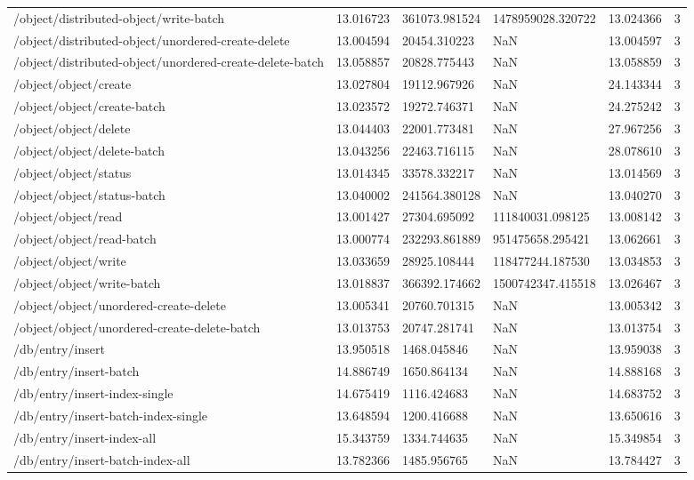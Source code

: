 \begin{tabularx}{\linewidth}{XXXXXX}
/object/distributed-object/write-batch & 13.016723 & 361073.981524 & 1478959028.320722 & 13.024366 & 3 \\
/object/distributed-object/unordered-create-delete & 13.004594 & 20454.310223 & NaN & 13.004597 & 3 \\
/object/distributed-object/unordered-create-delete-batch & 13.058857 & 20828.775443 & NaN & 13.058859 & 3 \\
/object/object/create & 13.027804 & 19112.967926 & NaN & 24.143344 & 3 \\
/object/object/create-batch & 13.023572 & 19272.746371 & NaN & 24.275242 & 3 \\
/object/object/delete & 13.044403 & 22001.773481 & NaN & 27.967256 & 3 \\
/object/object/delete-batch & 13.043256 & 22463.716115 & NaN & 28.078610 & 3 \\
/object/object/status & 13.014345 & 33578.332217 & NaN & 13.014569 & 3 \\
/object/object/status-batch & 13.040002 & 241564.380128 & NaN & 13.040270 & 3 \\
/object/object/read & 13.001427 & 27304.695092 & 111840031.098125 & 13.008142 & 3 \\
/object/object/read-batch & 13.000774 & 232293.861889 & 951475658.295421 & 13.062661 & 3 \\
/object/object/write & 13.033659 & 28925.108444 & 118477244.187530 & 13.034853 & 3 \\
/object/object/write-batch & 13.018837 & 366392.174662 & 1500742347.415518 & 13.026467 & 3 \\
/object/object/unordered-create-delete & 13.005341 & 20760.701315 & NaN & 13.005342 & 3 \\
/object/object/unordered-create-delete-batch & 13.013753 & 20747.281741 & NaN & 13.013754 & 3 \\
/db/entry/insert & 13.950518 & 1468.045846 & NaN & 13.959038 & 3 \\
/db/entry/insert-batch & 14.886749 & 1650.864134 & NaN & 14.888168 & 3 \\
/db/entry/insert-index-single & 14.675419 & 1116.424683 & NaN & 14.683752 & 3 \\
/db/entry/insert-batch-index-single & 13.648594 & 1200.416688 & NaN & 13.650616 & 3 \\
/db/entry/insert-index-all & 15.343759 & 1334.744635 & NaN & 15.349854 & 3 \\
/db/entry/insert-batch-index-all & 13.782366 & 1485.956765 & NaN & 13.784427 & 3 \\

\end{tabularx}
